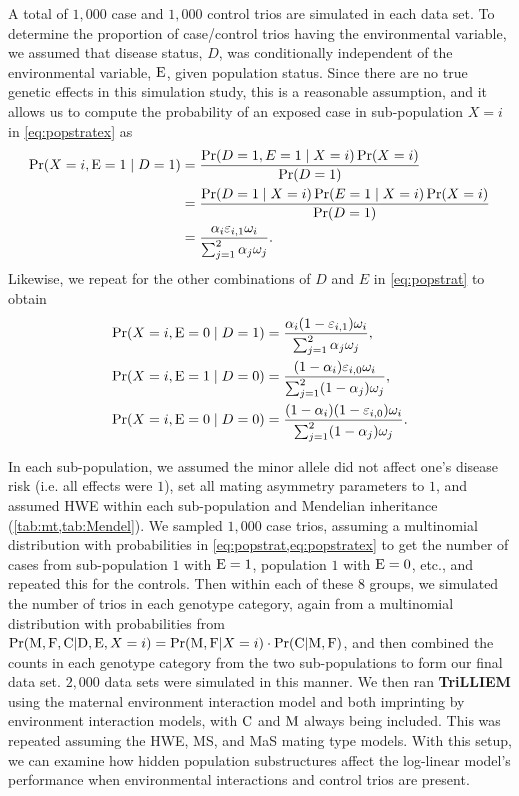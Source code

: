A total of $1,000$ case and $1,000$ control trios are simulated in each data set.
To determine the proportion of case/control trios having the environmental variable, we assumed that disease status, $D$, was conditionally independent of the environmental variable, ${\rm E}$, given population status.
Since there are no true genetic effects in this simulation study, this is a reasonable assumption, and it allows us to compute the probability of an exposed case in sub-population $X = i$ in \cref{eq:popstratex} as
\begin{align}\label{eq:popstratex}
  \Pr(X = i, {\rm E} = 1 \mid D = 1) &= \frac{\Pr(D = 1, E = 1 \mid X = i) \Pr(X = i)}{\Pr(D = 1)} \nonumber\\
                               &= \frac{\Pr(D = 1 \mid X = i) \Pr(E = 1 \mid X = i) \Pr(X = i)}{\Pr(D = 1)} \nonumber\\
                               &= \frac{\alpha_i \varepsilon_{i, 1} \omega_i}{\sum_{j = 1}^2 \alpha_j \omega_j }.
\end{align}
Likewise, we repeat for the other combinations of $D$ and $E$ in \cref{eq:popstrat} to obtain
\begin{subequations} \label{eq:popstrat}
\begin{align}
  \Pr(X = i, {\rm E} = 0 \mid D = 1) &= \frac{\alpha_i (1 - \varepsilon_{i, 1}) \omega_i}{\sum_{j = 1}^2 \alpha_j \omega_j }, \\
  \Pr(X = i, {\rm E} = 1 \mid D = 0) &= \frac{(1 - \alpha_i) \varepsilon_{i, 0} \omega_i}{\sum_{j = 1}^2 (1 - \alpha_j) \omega_j }, \\   
  \Pr(X = i, {\rm E} = 0 \mid D = 0) &= \frac{(1 - \alpha_i) (1 - \varepsilon_{i, 0}) \omega_i}{\sum_{j = 1}^2 (1 - \alpha_j) \omega_j }.\end{align}
\end{subequations}

In each sub-population, we assumed the minor allele did not affect one's disease risk (i.e. all effects were $1$), set all mating asymmetry parameters to $1$, and assumed HWE within each sub-population and Mendelian inheritance (\cref{tab:mt,tab:Mendel}).
We sampled $1,000$ case trios, assuming a multinomial distribution with probabilities in \cref{eq:popstrat,eq:popstratex} to get the number of cases from sub-population $1$ with ${\rm E} = 1$, population $1$ with ${\rm E} = 0$, etc., and repeated this for the controls.
Then within each of these $8$ groups, we simulated the number of trios in each genotype category, again from a multinomial distribution with probabilities from $\Pr({\rm M},{\rm F},{\rm C}|{\rm D},{\rm E},X=i) = \Pr({\rm M},{\rm F}|X=i) \cdot \Pr({\rm C}|{\rm M},{\rm F})$, and then combined the counts in each genotype category from the two sub-populations to form our final data set.
$2,000$ data sets were simulated in this manner.
We then ran \textbf{TriLLIEM} using the maternal environment interaction model and both imprinting by environment interaction models, with ${\rm C}$ and ${\rm M}$ always being included.
This was repeated assuming the HWE, MS, and MaS mating type models.
With this setup, we can examine how hidden population substructures affect the log-linear model's performance when environmental interactions and control trios are present.

